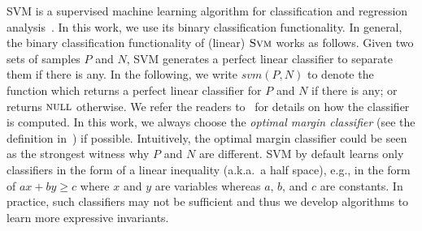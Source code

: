 

SVM is a supervised machine learning algorithm for classification and regression analysis~\cite{svm:original}. In this work, we use its binary classification functionality. 
In general, the binary classification functionality of (linear) $\textsc{Svm}$ works as follows. 
Given two sets of samples $P$ and $N$, SVM generates a perfect linear classifier to separate them if there is any. 
In the following, we write $\mathit{svm}(P, N)$ to denote the function which returns a perfect linear classifier for $P$ and $N$ if there is any; or returns $\textsc{null}$ otherwise. 
We refer the readers to~\cite{svm:smo} for details on how the classifier is computed. 
In this work, we always choose the \textit{optimal margin classifier} (see the definition in~\cite{sharma2012interpolants}) if possible. 
Intuitively, the optimal margin classifier could be seen as the strongest witness why $P$ and $N$ are different. 
SVM by default learns only classifiers in the form of a linear inequality (a.k.a.~a half space), 
e.g., in the form of $a x + b y \geq c$ where $x$ and $y$ are variables whereas $a$, $b$, and $c$ are constants. 
In practice, such classifiers may not be sufficient and thus we develop algorithms to learn more expressive invariants.

